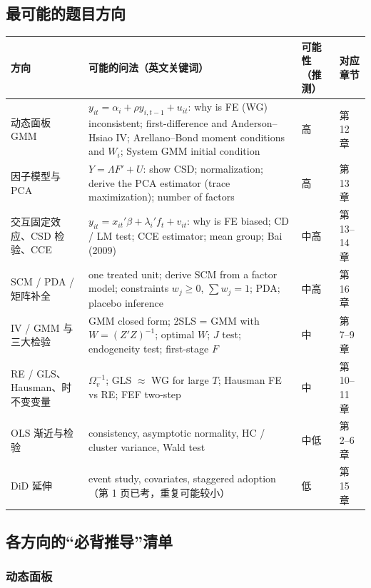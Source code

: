 \subsection{最可能的题目方向}

{\small\noindent
\begin{tabularx}{\linewidth}{@{}>{\raggedright\arraybackslash}p{2.6cm}L>{\centering\arraybackslash}p{1.3cm}>{\raggedright\arraybackslash}p{1.6cm}@{}}
\toprule
方向 & 可能的问法（英文关键词） & 可能性（推测） & 对应章节\\
\midrule
动态面板 GMM & $y_{it}=\alpha_i+\rho y_{i,t-1}+u_{it}$: why is FE (WG) inconsistent; first-difference and Anderson--Hsiao IV; Arellano--Bond moment conditions and $W_i$; System GMM initial condition & 高 & 第 12 章\\
因子模型与 PCA & $Y=\Lambda F'+U$: show CSD; normalization; derive the PCA estimator (trace maximization); number of factors & 高 & 第 13 章\\
交互固定效应、CSD 检验、CCE & $y_{it}=x_{it}'\beta+\lambda_i'f_t+v_{it}$: why is FE biased; CD / LM test; CCE estimator; mean group; Bai (2009) & 中高 & 第 13--14 章\\
SCM / PDA / 矩阵补全 & one treated unit; derive SCM from a factor model; constraints $w_j\ge0$, $\sum w_j=1$; PDA; placebo inference & 中高 & 第 16 章\\
IV / GMM 与三大检验 & GMM closed form; 2SLS = GMM with $W=(Z'Z)^{-1}$; optimal $W$; $J$ test; endogeneity test; first-stage $F$ & 中 & 第 7--9 章\\
RE / GLS、Hausman、时不变变量 & $\Omega_v^{-1}$; GLS $\approx$ WG for large $T$; Hausman FE vs RE; FEF two-step & 中 & 第 10--11 章\\
OLS 渐近与检验 & consistency, asymptotic normality, HC / cluster variance, Wald test & 中低 & 第 2--6 章\\
DiD 延伸 & event study, covariates, staggered adoption（第 1 页已考，重复可能较小） & 低 & 第 15 章\\
\bottomrule
\end{tabularx}
}

\subsection{各方向的“必背推导”清单}

\subsubsection{动态面板}

